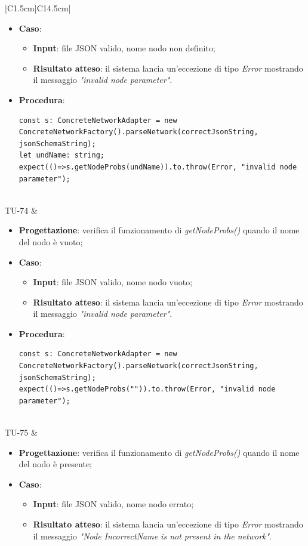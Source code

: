 \begin{longtable}{|C{1.5cm}|C{14.5cm}|}
\begin{itemize}
	\item \textbf{Caso}: 
	\begin{itemize}
		\item \textbf{Input}: file JSON valido, nome nodo non definito;
		\item \textbf{Risultato atteso}: il sistema lancia un'eccezione di tipo \emph{Error} mostrando il messaggio \emph{"invalid node parameter"}.
	\end{itemize}
	\item \textbf{Procedura}:
	\begin{lstlisting}
const s: ConcreteNetworkAdapter = new ConcreteNetworkFactory().parseNetwork(correctJsonString, jsonSchemaString);
let undName: string;
expect(()=>s.getNodeProbs(undName)).to.throw(Error, "invalid node parameter");
	\end{lstlisting}
\end{itemize}\\
\hline
{TU-74} &
\begin{itemize}
	\item \textbf{Progettazione}: verifica il funzionamento di \emph{getNodeProbs()} quando il nome del nodo è vuoto;
	\item \textbf{Caso}: 
	\begin{itemize}
		\item \textbf{Input}: file JSON valido, nome nodo vuoto;
		\item \textbf{Risultato atteso}: il sistema lancia un'eccezione di tipo \emph{Error} mostrando il messaggio \emph{"invalid node parameter"}.
	\end{itemize}
	\item \textbf{Procedura}:
	\begin{lstlisting}
const s: ConcreteNetworkAdapter = new ConcreteNetworkFactory().parseNetwork(correctJsonString, jsonSchemaString);
expect(()=>s.getNodeProbs("")).to.throw(Error, "invalid node parameter");
	\end{lstlisting}
\end{itemize}\\
\hline
{TU-75} &
\begin{itemize}
	\item \textbf{Progettazione}: verifica il funzionamento di \emph{getNodeProbs()} quando il nome del nodo è presente;
	\item \textbf{Caso}: 
	\begin{itemize}
		\item \textbf{Input}: file JSON valido, nome nodo errato;
		\item \textbf{Risultato atteso}: il sistema lancia un'eccezione di tipo \emph{Error} mostrando il messaggio \emph{"Node IncorrectName is not present in the network"}.

\end{itemize}
\end{itemize}
\end{longtable}
